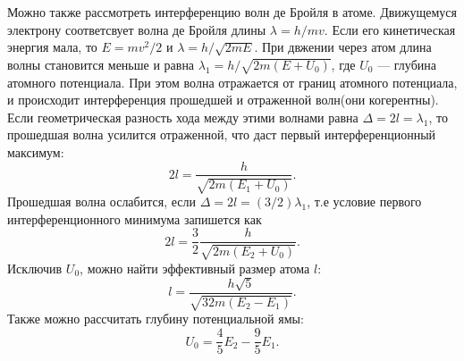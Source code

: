 \documentclass[11pt]{article}
\begin{document}
  Можно также рассмотреть интерференцию волн де Бройля в атоме. Движущемуся электрону соответсвует волна де Бройля длины $\lambda = h/mv$. Если его кинетическая энергия мала, то $E = mv^2/2$ и $\lambda = h/\sqrt{2mE}$. При двжении через атом длина волны становится меньше и равна $\lambda_1 = h/\sqrt{2m(E + U_0)}$, где $U_0$ --- глубина атомного потенциала. При этом волна отражается от границ атомного потенциала, и происходит интерференция прошедшей и отраженной волн(они когерентны). Если геометрическая разность хода между этими волнами равна $\Delta = 2l = \lambda_1$, то прошедшая волна усилится отраженной, что даст первый интерференционный максимум:
  \begin{equation} \label{max}
   2l = \frac{h}{\sqrt{2m(E_1 + U_0)}}.
  \end{equation}
  Прошедшая волна ослабится, если $\Delta = 2l = (3/2)\lambda_1$, т.е условие первого интерференционного минимума запишется как 
  \begin{equation} \label{min}
   2l = \frac{3}{2}\frac{h}{\sqrt{2m(E_2 + U_0)}}.
  \end{equation}
  Исключив $U_0$, можно найти эффективный размер атома $l$:
  \begin{equation} \label{l}
   l = \frac{h\sqrt{5}}{\sqrt{32m(E_2 - E_1)}}.
  \end{equation}
  Также можно рассчитать глубину потенциальной ямы:
  \begin{equation} \label{u0}
   U_0 = \frac{4}{5}E_2 - \frac{9}{5}E_1.
  \end{equation}
\end{document}
